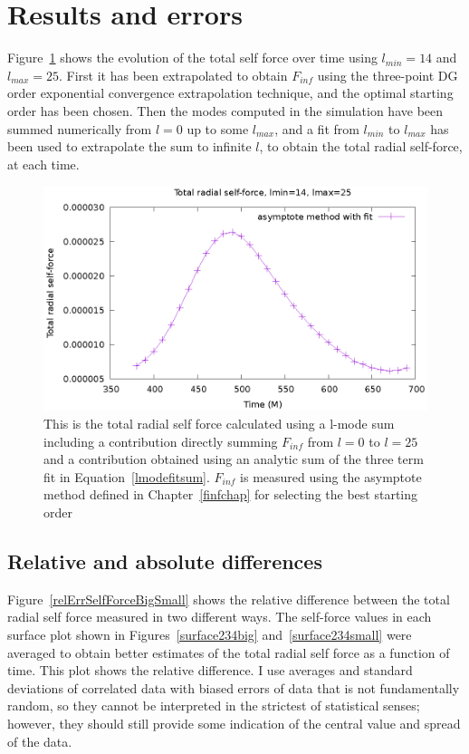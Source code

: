 \section{Results and errors}

Figure~\ref{totalselfforcevt2} shows the evolution of the total self force over time using $l_{min}=14$ and $l_{max}=25$. First it has been extrapolated to obtain $F_{inf}$ using the three-point DG order exponential convergence extrapolation technique, and the optimal starting order has been chosen. Then the modes computed in the simulation have been summed numerically from $l=0$ up to some $l_{max}$, and a fit from $l_{min}$ to $l_{max}$ has been used to extrapolate the sum to infinite $l$, to obtain the total radial self-force, at each time. 


\begin{figure}
  \includegraphics{totalselfforcevt2.eps}
  \caption{This is the total radial self force calculated using a l-mode sum including a contribution directly summing $F_{inf}$ from $l=0$ to $l=25$ and a contribution obtained using an analytic sum of the three term fit in Equation~\ref{lmodefitsum}. $F_{inf}$ is measured using the asymptote method defined in Chapter~\ref{finfchap} for selecting the best starting order}
\label{totalselfforcevt2}
\end{figure}


\subsection{Relative and absolute differences}

Figure~\ref{relErrSelfForceBigSmall} shows the relative difference between the total radial self force measured in two different ways. The self-force values in each surface plot shown in Figures~\ref{surface234big} and~\ref{surface234small} were averaged to obtain better estimates of the total radial self force as a function of time. This plot shows the relative difference. I use averages and standard deviations of correlated data with biased errors of data that is not fundamentally random, so they cannot be interpreted in the strictest of statistical senses; however, they should still provide some indication of the central value and spread of the data.

